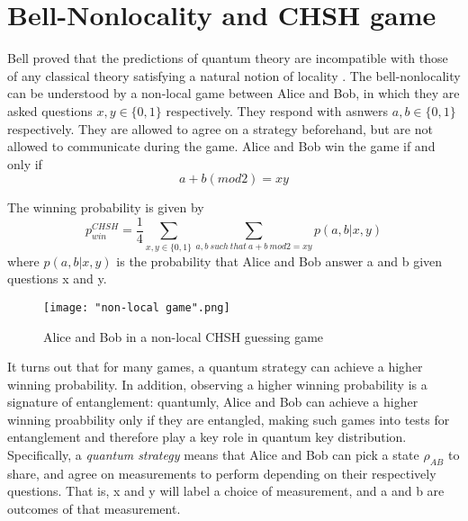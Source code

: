 
\pagebreak

\section{Bell-Nonlocality and CHSH game} \label{section: bell-nonlocality}

Bell proved that the predictions of quantum theory are incompatible with those of any classical theory satisfying a natural notion of locality \cite{bell1964}. The bell-nonlocality can be understood by a non-local game between Alice and Bob, in which they are asked questions $x,y \in \{0,1\}$ respectively. They respond with asnwers $a, b \in \{0,1\}$ respectively. They are allowed to agree on a strategy beforehand, but are not allowed to communicate during the game. Alice and Bob win the game if and only if 
\begin{equation*}
 a+b (mod 2)=xy    
\end{equation*}

The winning probability is given by 
\begin{equation*}
    p^{CHSH}_{win} = \frac{1}{4}\sum_{x,y \in \{0,1\}} \sum_{a, b \: such \: that \: a+b \: mod 2 = xy} p(a,b|x,y)
\end{equation*}
where $p(a,b|x,y)$ is the probability that Alice and Bob answer a and b given questions x and y.

\begin{figure}[h]
    \centering
    \texttt{[image: "non-local game".png]}
    \caption{Alice and Bob in a non-local CHSH guessing game}
    \label{fig:non-local game}
\end{figure}

It turns out that for many games, a quantum strategy can achieve a higher winning probability. In addition, observing a higher winning probability is a signature of entanglement: quantumly, Alice and Bob can achieve a higher winning proabbility only if they are entangled, making such games into tests for entanglement and therefore play a key role in quantum key distribution. Specifically, a \textit{quantum strategy} means that Alice and Bob can pick a state $\rho_{AB}$ to share, and agree on measurements to perform depending on their respectively questions. That is, x and y will label a choice of measurement, and a and b are outcomes of that measurement.

